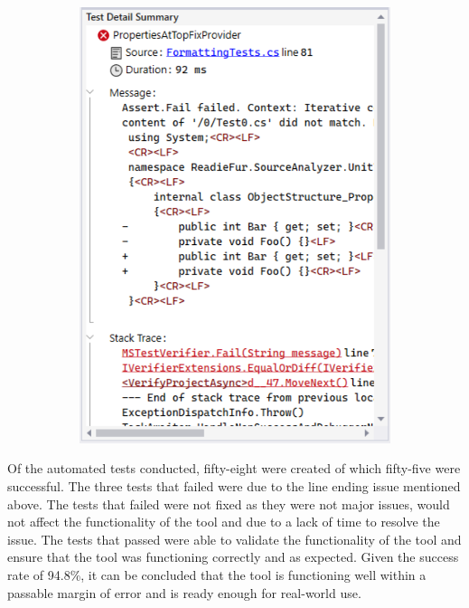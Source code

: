 \begin{figure}[H]
\begin{subfigure}[t]{0.35\textwidth}
        \includegraphics[width=\linewidth, height=0.35\textheight, keepaspectratio]{Figures/UnitTestFailing.png}
    \end{subfigure}
\end{figure}

Of the automated tests conducted, fifty-eight were created of which fifty-five were successful. The three tests that failed were due to the line ending issue mentioned above. The tests that failed were not fixed as they were not major issues, would not affect the functionality of the tool and due to a lack of time to resolve the issue. The tests that passed were able to validate the functionality of the tool and ensure that the tool was functioning correctly and as expected. Given the success rate of 94.8\%, it can be concluded that the tool is functioning well within a passable margin of error and is ready enough for real-world use.

